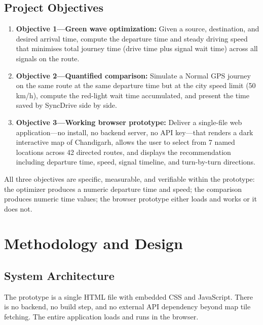 \documentclass[12pt,a4paper]{report}
\begin{document}
\section{Project Objectives}

\begin{enumerate}
  \item \textbf{Objective 1---Green wave optimization:} Given a source,
        destination, and desired arrival time, compute the departure time and
        steady driving speed that minimises total journey time (drive time plus
        signal wait time) across all signals on the route.

  \item \textbf{Objective 2---Quantified comparison:} Simulate a Normal GPS
        journey on the same route at the same departure time but at the city
        speed limit (50\,km/h), compute the red-light wait time accumulated,
        and present the time saved by SyncDrive side by side.

  \item \textbf{Objective 3---Working browser prototype:} Deliver a
        single-file web application---no install, no backend server, no API
        key---that renders a dark interactive map of Chandigarh, allows the
        user to select from 7 named locations across 42 directed routes, and
        displays the recommendation including departure time, speed, signal
        timeline, and turn-by-turn directions.
\end{enumerate}

All three objectives are specific, measurable, and verifiable within the
prototype: the optimizer produces a numeric departure time and speed; the
comparison produces numeric time values; the browser prototype either loads
and works or it does not.

\chapter{Methodology and Design}

\section{System Architecture}

The prototype is a single HTML file with embedded CSS and JavaScript. There is
no backend, no build step, and no external API dependency beyond map tile
fetching. The entire application loads and runs in the browser.
\end{document}
